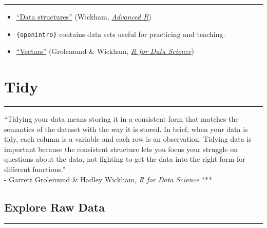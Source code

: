 \documentclass[
]{book}
\providecommand{\tightlist}{%
  \setlength{\itemsep}{0pt}\setlength{\parskip}{0pt}}
\begin{document}
\begin{center}\rule{0.5\linewidth}{0.5pt}\end{center}

\begin{itemize}
\tightlist
\item
  \href{http://adv-r.had.co.nz/Data-structures.html}{``Data structures''} (Wickham, \href{http://adv-r.had.co.nz/}{\emph{Advanced R}})
\item
  \texttt{\{openintro\}} contains data sets useful for practicing and teaching.
\item
  \href{https://r4ds.had.co.nz/vectors.html}{``Vectors''} (Grolemund \& Wickham, \href{https://r4ds.had.co.nz/}{\emph{R for Data Science}})
\end{itemize}

\hypertarget{tidy}{%
\chapter{Tidy}\label{tidy}}

\begin{center}\rule{0.5\linewidth}{0.5pt}\end{center}

``Tidying your data means storing it in a consistent form that matches the semantics of the dataset with the way it is stored. In brief, when your data is tidy, each column is a variable and each row is an observation. Tidying data is important because the consistent structure lets you focus your struggle on questions about the data, not fighting to get the data into the right form for different functions.''\\
- Garrett Grolemund \& Hadley Wickham, \emph{R for Data Science}
***

\hypertarget{explore-raw-data}{%
\section{Explore Raw Data}\label{explore-raw-data}}

\begin{center}\rule{0.5\linewidth}{0.5pt}\end{center}
\end{document}
